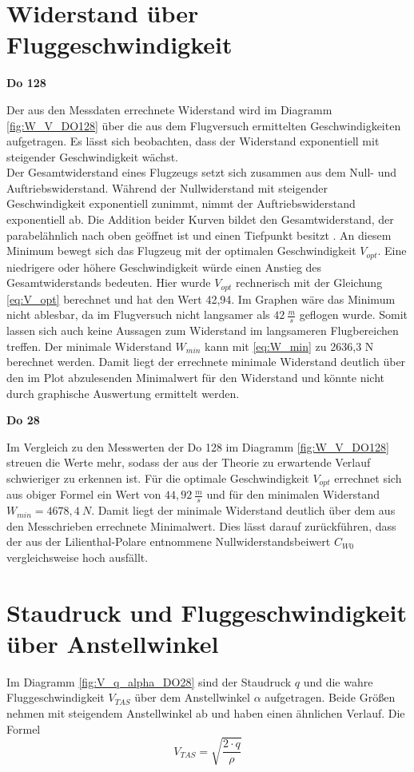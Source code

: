 \section{Widerstand über Fluggeschwindigkeit}

\textbf{Do 128}

Der aus den Messdaten errechnete Widerstand wird im Diagramm \ref{fig:W_V_DO128} über die aus dem Flugversuch ermittelten Geschwindigkeiten aufgetragen. Es lässt sich beobachten, dass der Widerstand exponentiell mit steigender Geschwindigkeit wächst. \\
Der Gesamtwiderstand eines Flugzeugs setzt sich zusammen aus dem Null- und Auftriebswiderstand. Während der Nullwiderstand mit steigender Geschwindigkeit exponentiell zunimmt, nimmt der Auftriebswiderstand exponentiell ab. Die Addition beider Kurven bildet den Gesamtwiderstand, der parabelähnlich nach oben geöffnet ist und einen Tiefpunkt besitzt \cite{Skript}. An diesem Minimum bewegt sich das Flugzeug mit der optimalen Geschwindigkeit $V_{opt}$. Eine niedrigere oder höhere Geschwindigkeit würde einen Anstieg des Gesamtwiderstands bedeuten. Hier wurde $V_{opt}$ rechnerisch mit der Gleichung \ref{eq:V_opt} berechnet und hat den Wert 42,94. Im Graphen wäre das Minimum nicht ablesbar, da im Flugversuch nicht langsamer als $42 \ \frac{m}{s}$ geflogen wurde. Somit lassen sich auch keine Aussagen zum Widerstand im langsameren Flugbereichen treffen. Der minimale Widerstand $W_{min}$ kann mit \ref{eq:W_min} zu 2636,3 N berechnet werden. Damit liegt der errechnete minimale Widerstand deutlich über den im Plot abzulesenden Minimalwert für den Widerstand und könnte nicht durch graphische Auswertung ermittelt werden.

\textbf{Do 28}

Im Vergleich zu den Messwerten der Do 128 im Diagramm \ref{fig:W_V_DO128} streuen die Werte mehr, sodass der aus der Theorie zu erwartende Verlauf schwieriger zu erkennen ist. Für die optimale Geschwindigkeit $V_{opt}$ errechnet sich aus obiger Formel ein Wert von $44,92 \ \frac{m}{s}$ und für den minimalen Widerstand $W_{min}=4678,4 \ N$. Damit liegt der minimale Widerstand deutlich über dem aus den Messchrieben errechnete Minimalwert. Dies lässt darauf zurückführen, dass der aus der Lilienthal-Polare entnommene Nullwiderstandsbeiwert $C_{W0}$ vergleichsweise hoch ausfällt. 


\section{Staudruck und Fluggeschwindigkeit über Anstellwinkel}
Im  Diagramm \ref{fig:V_q_alpha_DO28} sind der Staudruck $q$ und die wahre Fluggeschwindigkeit $V_{TAS}$ über dem Anstellwinkel $\alpha$ aufgetragen. Beide Größen nehmen mit steigendem Anstellwinkel ab und haben einen ähnlichen Verlauf. Die Formel \cite{Kurzskript}
\begin{equation}
V_{TAS}=\sqrt{\frac{2 \cdot q}{\rho}}
\end{equation}

